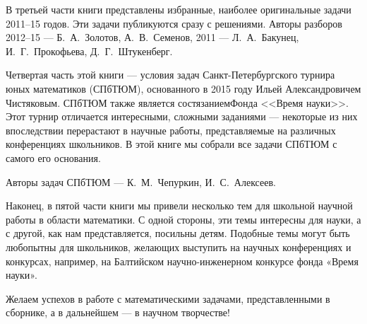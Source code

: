 \aabz В третьей части книги представлены избранные, наиболее оригинальные задачи 2011–15 годов. Эти задачи публикуются сразу с решениями. Авторы разборов 2012–15 — Б.~А.~Золотов, А.~В.~Семенов, 2011 — Л.~А.~Бакунец, И.~Г.~Прокофьева, Д.~Г.~Штукенберг.

\aabz Четвертая часть этой книги --- условия задач Санкт-Петербургского турнира юных математиков (СПбТЮМ),  основанного в 2015 году Ильей Александровичем Чистяковым. СПбТЮМ также является состязанием\linebreak Фонда <<Время науки>>. Этот турнир отличается интересными, сложными заданиями --- некоторые из них впоследствии перерастают в научные работы, представляемые на различных конференциях школьников. В этой книге мы собрали все задачи СПбТЮМ с самого его основания.

\aabz Авторы задач СПбТЮМ — К.~М.~Чепуркин, И.~С.~Алексеев.

\thispagestyle{empty}

\aabz Наконец, в пятой части книги мы привели несколько тем для школьной научной работы  в области математики. С одной стороны, эти темы  интересны для науки, а с другой, как нам представляется, посильны детям. Подобные темы могут быть любопытны для школьников, желающих выступить на научных конференциях и конкурсах, например, на Балтийском научно-инженерном конкурсе фонда «Время науки».

\aabz Желаем успехов в работе с математическими задачами, представленными в сборнике, а в дальнейшем --- в научном творчестве!


